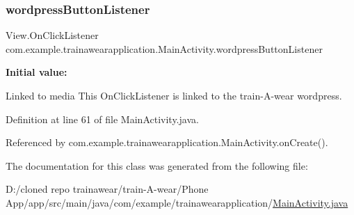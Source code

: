 \subsubsection{\texorpdfstring{wordpressButtonListener}{wordpressButtonListener}}
{\footnotesize\ttfamily View.\+On\+Click\+Listener com.\+example.\+trainawearapplication.\+Main\+Activity.\+wordpress\+Button\+Listener\hspace{0.3cm}{\ttfamily [private]}}

{\bfseries Initial value\+:}
\begin{DoxyCode}{0}
\DoxyCodeLine{        \}}
\DoxyCodeLine{    \}}

\end{DoxyCode}


Linked to media This On\+Click\+Listener is linked to the train-\/\+A-\/wear wordpress. 



Definition at line 61 of file Main\+Activity.\+java.



Referenced by com.\+example.\+trainawearapplication.\+Main\+Activity.\+on\+Create().



The documentation for this class was generated from the following file\+:\begin{DoxyCompactItemize}
\item 
D\+:/cloned repo trainawear/train-\/\+A-\/wear/\+Phone App/app/src/main/java/com/example/trainawearapplication/\mbox{\hyperlink{_main_activity_8java}{Main\+Activity.\+java}}\end{DoxyCompactItemize}
